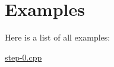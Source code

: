 \section{Examples}
Here is a list of all examples:\begin{DoxyCompactItemize}
\item 
\hyperlink{step-0_8cpp-example}{step-\/0.cpp}
\end{DoxyCompactItemize}
